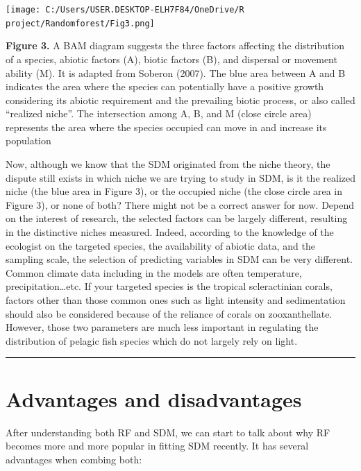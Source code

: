 \documentclass[
]{article}
\begin{document}
\texttt{[image: C:/Users/USER.DESKTOP-ELH7F84/OneDrive/R project/Randomforest/Fig3.png]}

\textbf{Figure 3.} A BAM diagram suggests the three factors affecting
the distribution of a species, abiotic factors (A), biotic factors (B),
and dispersal or movement ability (M). It is adapted from Soberon
(2007). The blue area between A and B indicates the area where the
species can potentially have a positive growth considering its abiotic
requirement and the prevailing biotic process, or also called ``realized
niche''. The intersection among A, B, and M (close circle area)
represents the area where the species occupied can move in and increase
its population

Now, although we know that the SDM originated from the niche theory, the
dispute still exists in which niche we are trying to study in SDM, is it
the realized niche (the blue area in Figure 3), or the occupied niche
(the close circle area in Figure 3), or none of both? There might not be
a correct answer for now. Depend on the interest of research, the
selected factors can be largely different, resulting in the distinctive
niches measured. Indeed, according to the knowledge of the ecologist on
the targeted species, the availability of abiotic data, and the sampling
scale, the selection of predicting variables in SDM can be very
different. Common climate data including in the models are often
temperature, precipitation\ldots{}etc. If your targeted species is the
tropical scleractinian corals, factors other than those common ones such
as light intensity and sedimentation should also be considered because
of the reliance of corals on zooxanthellate. However, those two
parameters are much less important in regulating the distribution of
pelagic fish species which do not largely rely on light.

\begin{center}\rule{0.5\linewidth}{0.5pt}\end{center}

\hypertarget{advantages-and-disadvantages}{%
\section{Advantages and
disadvantages}\label{advantages-and-disadvantages}}

After understanding both RF and SDM, we can start to talk about why RF
becomes more and more popular in fitting SDM recently. It has several
advantages when combing both:
\end{document}
